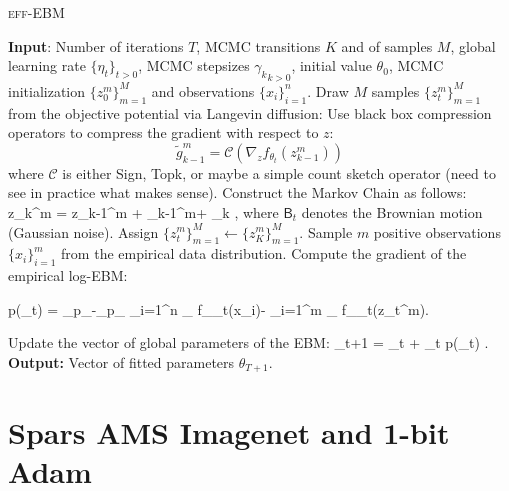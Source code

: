 \documentclass{article}
\newcommand{\algo}{\textsc{eff-EBM}}
\begin{document}
\begin{algorithm}[H]
\caption{\algo\ } \label{alg:anila}
\begin{algorithmic}[1]
\STATE \textbf{Input}: Number of iterations $T$, MCMC transitions $K$ and of samples $M$, global learning rate $\{\eta_t\}_{t >0}$,  MCMC stepsizes ${\gamma_k}_{k >0}$, initial value $\theta_0$, MCMC initialization $\{ z_{0}^m \}_{m=1}^M$ and observations $\{ x_{i} \}_{i=1}^n$.
\STATE Draw $M$ samples $\{ z_{t}^m \}_{m=1}^M$ from the objective potential via Langevin diffusion:\label{line:langevin}
\STATE Use black box compression operators to compress the gradient with respect to $z$:
$$
\tilde{g}_{k-1}^m = \mathcal{C}(\nabla_z f_{\theta_t}(z_{k-1}^m) )
$$
where $\mathcal{C}$ is either Sign, Topk, or maybe a simple count sketch operator (need to see in practice what makes sense).
\STATE Construct the Markov Chain as follows:
\beq\label{eq:anila}
z_{k}^{m} = z_{k-1}^m +  _{k-1}^m+  _k \eqsp,
\eeq
where $\mathsf{B}_t$ denotes the Brownian motion (Gaussian noise).
\ENDFOR
\STATE Assign $\{ z_{t}^m \}_{m=1}^M \leftarrow \{ z_{K}^m \}_{m=1}^M$.
\STATE Sample $m$ positive observations $\{ x_{i} \}_{i=1}^m$ from the empirical data distribution.
\STATE Compute the gradient of the empirical log-EBM:
\beq\notag
\begin{split}
\nabla \log p(\theta_t) 
 = _{p_{}}-_{p_{\theta}}\approx  {} \sum_{i=1}^{n} \nabla_{\theta} f_{\theta_t}\left(x_{i}\right)- \sum_{i=1}^{m} \nabla_{\theta} f_{\theta_t}\left(z_t^m\right)\eqsp.
\end{split}
\eeq
\STATE Update the vector of global parameters of the EBM:\label{line:gradient}
\beq\notag
\theta_{t+1} = \theta_{t} + \eta_t \nabla \log p(\theta_t) \eqsp.
\eeq
\ENDFOR
\STATE \textbf{Output:} Vector of fitted parameters $\theta_{T+1}$.
\end{algorithmic}
\end{algorithm}


\section{Spars AMS Imagenet and 1-bit Adam}




\end{document}
